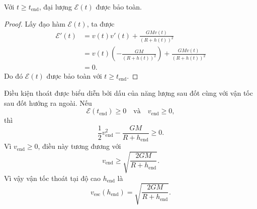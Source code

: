 ﻿\documentclass[12pt]{article}
\begin{document}
\begin{lemma}
Với $t\ge t_{\mathrm{end}}$, đại lượng $\mathcal E(t)$ được bảo toàn.
\end{lemma}

\begin{proof}
Lấy đạo hàm $\mathcal E(t)$, ta được
\[
\begin{aligned}
 \mathcal E'(t)
 & =
 v(t)v'(t) + \frac{GMv(t)}{(R + h(t))^2}\\
 & =
 v(t)\left(-\frac{GM}{(R + h(t))^2}\right)
 +
 \frac{GMv(t)}{(R + h(t))^2}\\
 & = 0.
\end{aligned}
\]
Do đó $\mathcal E(t)$ được bảo toàn với $t\ge t_{\mathrm{end}}$.
\end{proof}
Điều kiện thoát được biểu diễn bởi dấu của năng lượng sau đốt cùng với vận tốc sau đốt hướng ra ngoài.
Nếu
\[
 \mathcal E(t_{\mathrm{end}})\ge0
 \quad\text{và}\quad
 v_{\mathrm{end}}\ge0,
\]
thì
\[
 \frac{1}{2}v_{\mathrm{end}}^2 - \frac{GM}{R + h_{\mathrm{end}}}\ge0.
\]
Vì $v_{\mathrm{end}}\ge0$, điều này tương đương với
\[
 v_{\mathrm{end}}\ge \sqrt{\frac{2GM}{R + h_{\mathrm{end}}}}.
\]
Vì vậy vận tốc thoát tại độ cao $h_{\mathrm{end}}$ là
\[
 \boxed{
 v_{\mathrm{esc}}(h_{\mathrm{end}})
 =
 \sqrt{\frac{2GM}{R + h_{\mathrm{end}}}}.
 }
\]
\end{document}
